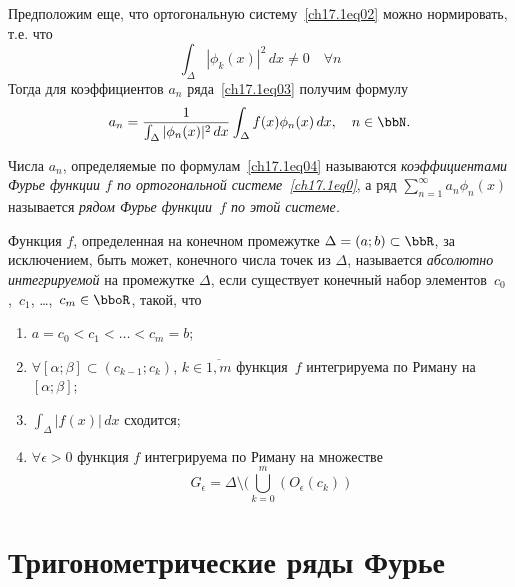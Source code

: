 Предположим еще, что ортогональную систему~\eqref{ch17.1eq02} можно нормировать, т.е. что
$$
\int_\Delta|\phi_k(x)|^2\,dx\ne 0 \quad \forall n
$$
Тогда для коэффициентов $a_n$ ряда~\eqref{ch17.1eq03} получим формулу
\begin{equation} \label{ch17.1eq04}
a_n= \frac{1}{\int_\Delta|\phi_n(x)|^2\,dx} \int_\Delta f(x)\phi_n(x)\,dx, \quad n\in \bbN.
\end{equation}

\begin{defn}
Числа $a_n$, определяемые по формулам~\eqref{ch17.1eq04} называются \textit{коэффициентами Фурье функции $f$ по ортогональной системе~\eqref{ch17.1eq0}}, а ряд $\sum_{n = 1}^{\infty} a_n \phi_n(x)$ называется \textit{рядом Фурье функции~$f$ по этой системе.} 	
\end{defn}

\begin{defn} 
Функция $f$, определенная на конечном промежутке $\Delta=(a;b)\subset \bbR$, за исключением, быть может, конечного числа точек из $\Delta$, называется \textit{абсолютно интегрируемой} на промежутке $\Delta$, если существует конечный набор элементов~$c_0$,~$c_1$, \ldots,~$c_m \in \bboR$, такой, что
\begin{enumerate}
\item
$a=c_0<c_1<\ldots<c_m=b$;
\item
$\forall [\alpha;\beta]\subset(c_{k-1};c_k)$, $k\in \overline{1,m}$ функция~$f$ интегрируема по Риману на $[\alpha;\beta]$;	
\item
$\int_\Delta |f(x)|\,dx$ сходится;
\item
$ \forall\epsilon>0$ функция $f$ интегрируема по Риману на множестве 
$$G_{\epsilon}=\Delta \setminus (\bigcup_{k=0}^{m}(O_{\epsilon}(c_k))$$
\end{enumerate}	
\end{defn}
\section{Тригонометрические ряды Фурье}	
	

